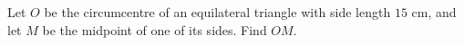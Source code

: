 Let $O$ be the circumcentre of an equilateral triangle with side length $15$ cm, and let $M$ be the midpoint of one of its sides. Find $OM$.

